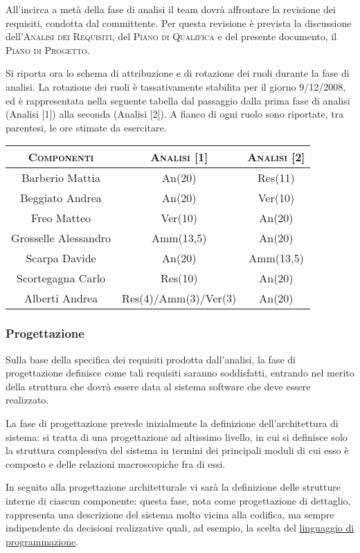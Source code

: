 \documentclass[11pt,a4paper]{article}
\begin{document}
All'incirca a metà della fase di analisi il team dovrà affrontare la revisione dei requisiti, condotta dal committente.
Per questa revisione è prevista la discussione dell'\textsc{Analisi dei Requisiti}, del \textsc{Piano di Qualifica} e del presente documento, il \textsc{Piano di Progetto}.

Si riporta ora lo schema di attribuzione e di rotazione dei ruoli durante la fase di analisi.
La rotazione dei ruoli è tassativamente stabilita per il giorno 9/12/2008, ed è rappresentata nella seguente tabella dal passaggio dalla prima fase di analisi (Analisi [1]) alla seconda (Analisi [2]).
A fianco di ogni ruolo sono riportate, tra parentesi, le ore stimate da esercitare.
\\
\begin{center}
\begin{tabular}{|c||c|c|}
\hline
\textsc{Componenti} & \textsc{Analisi [1]} & \textsc{Analisi [2]} \\ \hline \hline
Barberio Mattia & An(20) & Res(11) \\ \hline
Beggiato Andrea & An(20) & Ver(10) \\ \hline
Freo Matteo & Ver(10) & An(20) \\ \hline
Grosselle Alessandro & Amm(13,5) & An(20) \\ \hline
Scarpa Davide & An(20) & Amm(13,5) \\ \hline
Scortegagna Carlo & Res(10) & An(20) \\ \hline
Alberti Andrea & Res(4)/Amm(3)/Ver(3) & An(20) \\ \hline
\end{tabular}
\end{center}
\bigskip
\subsubsection{Progettazione}
Sulla base della specifica dei requisiti prodotta dall'analisi, la fase di progettazione definisce come tali requisiti saranno soddisfatti, entrando nel merito della struttura che dovrà essere data al sistema software che deve essere realizzato.

La fase di progettazione prevede inizialmente la definizione dell'architettura di sistema: si tratta di una progettazione ad altissimo livello, in cui si definisce solo la struttura complessiva del sistema in termini dei principali moduli di cui esso è composto e delle relazioni macroscopiche fra di essi.

In seguito alla progettazione architetturale vi sarà la definizione delle strutture interne di ciascun componente: questa fase, nota come progettazione di dettaglio, rappresenta una descrizione del sistema molto vicina alla codifica, ma sempre indipendente da decisioni realizzative quali, ad esempio, la scelta del \underline{linguaggio di programmazione}.
\end{document}
